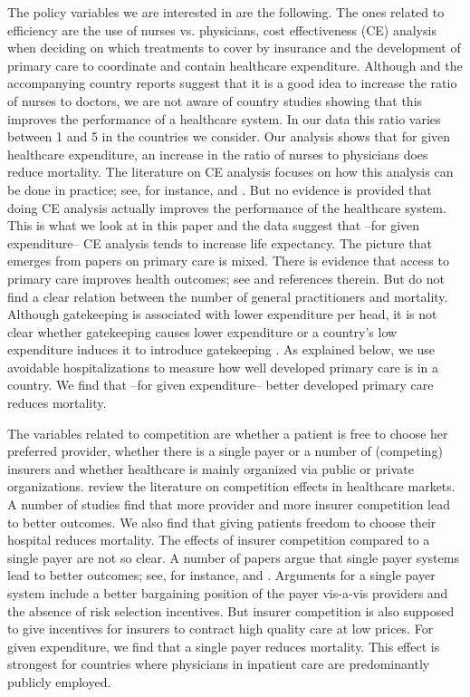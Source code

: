 \documentclass[a4paper,12pt]{article}
\begin{document}
The policy variables we are interested in are the following. The ones related to efficiency are the use of nurses vs. physicians, cost effectiveness (CE) analysis when deciding on which treatments to cover by insurance and the development of primary care to coordinate and contain healthcare expenditure. Although \cite{countryprofileReport} and the accompanying country reports suggest that it is a good idea to increase the ratio of nurses to doctors, we are not aware of country studies showing that this improves the performance of a healthcare system. In our data this ratio varies between 1 and 5 in the countries we consider. Our analysis shows that for given healthcare expenditure, an increase in the ratio of nurses to physicians does reduce mortality. The literature on CE analysis focuses on how this analysis can be done in practice; see, for instance, \cite{Drummond2005} and \cite{Gold96e}. But no evidence is provided that doing CE analysis actually improves the performance of the healthcare system. This is what we look at in this paper and the data suggest that --for given expenditure-- CE analysis tends to increase life expectancy. The picture that emerges from papers on primary care is mixed. There is evidence that access to primary care improves health outcomes; see \cite{starfield2005} and references therein. But \cite{AAKVIK20061139} do not find a clear relation between the number of general practitioners and mortality. Although gatekeeping is associated with lower expenditure per head, it is not clear whether gatekeeping causes lower expenditure or a country's low expenditure induces it to introduce gatekeeping \citep{Forrest692}. As explained below, we use avoidable hospitalizations to measure how well developed primary care is in a country. We find that --for given expenditure-- better developed primary care reduces mortality.

The variables related to competition are whether a patient is free to choose her preferred provider, whether there is a single payer or a number of (competing) insurers and whether healthcare is mainly organized via public or private organizations. \cite{NBERw19800} review the literature on competition effects in healthcare markets. A number of studies find that more provider and more insurer competition lead to better outcomes. We also find that giving patients freedom to choose their hospital reduces mortality. The effects of insurer competition compared to a single payer are not so clear. A number of papers argue that single payer systems lead to better outcomes; see, for instance, \cite{BICHAY2020113454} and \cite{OberlanderSinglePayer}. Arguments for a single payer system include a better bargaining position of the payer vis-a-vis providers and the absence of risk selection incentives. But insurer competition is also supposed to give incentives for insurers to contract high quality care at low prices. For given expenditure, we find that a single payer reduces mortality. This effect is strongest for countries where physicians in inpatient care are predominantly publicly employed.
\end{document}
